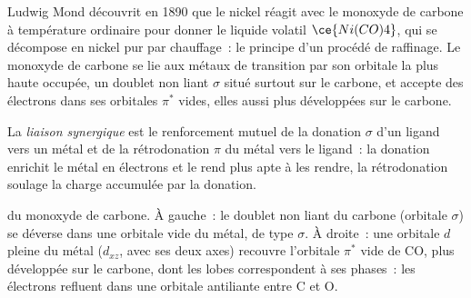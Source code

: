 Ludwig Mond découvrit en 1890 que le nickel réagit avec le monoxyde de
carbone à température ordinaire pour donner le liquide volatil
$\ce{Ni(CO)4}$, qui se décompose en nickel pur par chauffage~: le principe
d'un procédé de raffinage. Le monoxyde de carbone se lie aux métaux de
transition par son orbitale la plus haute occupée, un doublet non liant
$\sigma$ situé surtout sur le carbone, et accepte des électrons dans ses
orbitales $\pi^*$ vides, elles aussi plus développées sur le carbone.

\begin{definition}\label{def:b3:organometallic-bonding:synergic}
La \emph{liaison synergique} est le renforcement
mutuel de la donation $\sigma$ d'un ligand vers un métal et de la rétrodonation $\pi$ du métal
vers le ligand~: la donation enrichit le métal en électrons et le rend plus
apte à les rendre, la rétrodonation soulage la charge accumulée par la
donation.
\end{definition}

\begin{omfigure}

{\small {} du monoxyde de carbone. À gauche~: le doublet
non liant du carbone (orbitale $\sigma$) se déverse dans une orbitale vide du métal, de type
$\sigma$. À droite~: une orbitale $d$ pleine du métal ($d_{xz}$, avec ses deux axes)
recouvre l'orbitale $\pi^*$ vide de CO, plus développée sur le carbone, dont
les lobes correspondent à ses phases~: les électrons refluent dans une
orbitale antiliante entre C et O.}
\end{omfigure}

